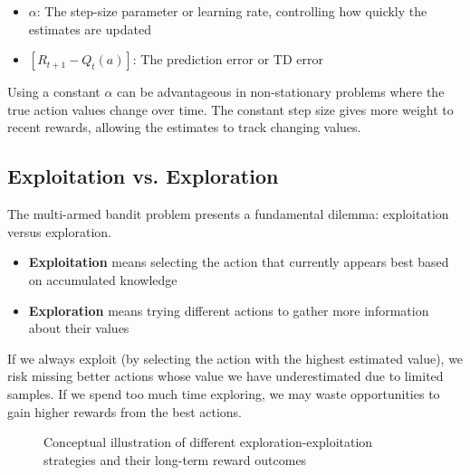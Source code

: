 \documentclass{article}
\begin{document}
\begin{tcolorbox}[colback=blue!5!white,colframe=blue!75!black,title=Notation Overview]
\begin{itemize}
    \item $\alpha$: The step-size parameter or learning rate, controlling how quickly the estimates are updated
    \item $[R_{t+1} - Q_t(a)]$: The prediction error or TD error
\end{itemize}
\end{tcolorbox}

Using a constant $\alpha$ can be advantageous in non-stationary problems where the true action values change over time. The constant step size gives more weight to recent rewards, allowing the estimates to track changing values.

\subsection{Exploitation vs. Exploration}
The multi-armed bandit problem presents a fundamental dilemma: exploitation versus exploration.

\begin{itemize}
    \item \textbf{Exploitation} means selecting the action that currently appears best based on accumulated knowledge
    \item \textbf{Exploration} means trying different actions to gather more information about their values
\end{itemize}

If we always exploit (by selecting the action with the highest estimated value), we risk missing better actions whose value we have underestimated due to limited samples. If we spend too much time exploring, we may waste opportunities to gain higher rewards from the best actions.

\begin{figure}[h]
\centering
{}
\caption{Conceptual illustration of different exploration-exploitation strategies and their long-term reward outcomes}
\end{figure}
\end{document}
